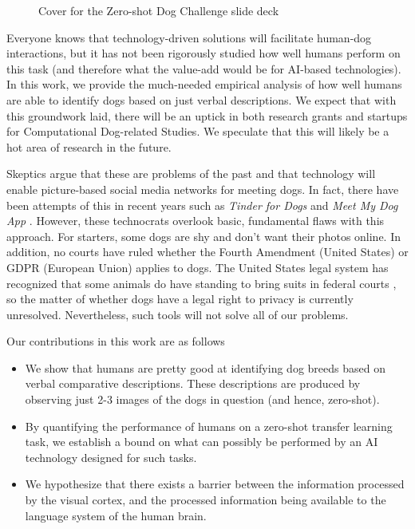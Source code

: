 \documentclass[sigplan,10pt]{acmart}
\begin{document}
\begin{figure}[h!]
    \caption{Cover for the Zero-shot Dog Challenge slide deck}
    \label{fig:cover}
\end{figure}

Everyone knows that technology-driven solutions will facilitate human-dog interactions, but it has not been rigorously studied how well humans perform on this task (and therefore what the value-add would be for AI-based technologies). In this work, we provide the much-needed empirical analysis of how well humans are able to identify dogs based on just verbal descriptions. We expect that with this groundwork laid, there will be an uptick in both research grants and startups for Computational Dog-related Studies. We speculate that this will likely be a hot area of research in the future.

Skeptics argue that these are problems of the past and that technology will enable picture-based social media networks for meeting dogs. In fact, there have been attempts of this in recent years such as \textit{Tinder for Dogs} \cite{tindog} and \textit{Meet My Dog App} \cite{meetmydog}. However, these technocrats overlook basic, fundamental flaws with this approach. For starters, some dogs are shy and don't want their photos online. In addition, no courts have ruled whether the Fourth Amendment (United States) or GDPR (European Union) applies to dogs. The United States legal system has recognized that some animals do have standing to bring suits in federal courts \cite{monkey-standing}, so the matter of whether dogs have a legal right to privacy is currently unresolved. Nevertheless, such tools will not solve all of our problems.

Our contributions in this work are as follows
\begin{itemize}
    \item We show that humans are pretty good at identifying dog breeds based on verbal comparative descriptions. These descriptions are produced by observing just 2-3 images of the dogs in question (and hence, zero-shot).
    \item By quantifying the performance of humans on a zero-shot transfer learning task, we establish a bound on what can possibly be performed by an AI technology designed for such tasks.
    \item We hypothesize that there exists a barrier between the information processed by the visual cortex, and the processed information being available to the language system of the human brain.
\end{itemize}
\end{document}
